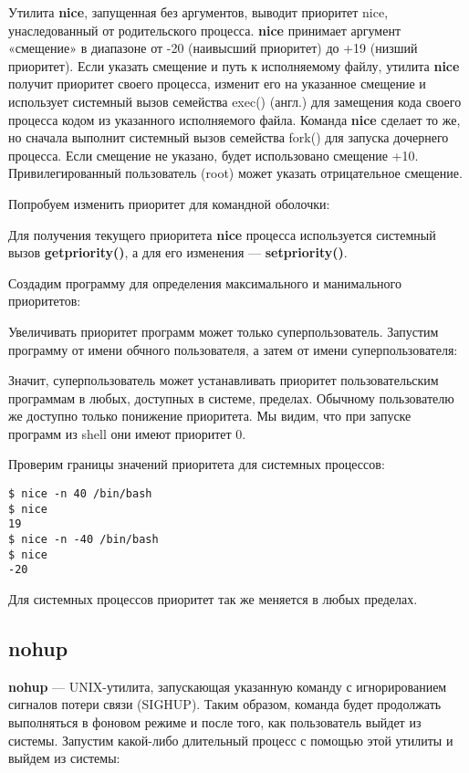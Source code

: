 \documentclass[a4paper]{article}
\begin{document}
	Утилита \textbf{nice}, запущенная без аргументов, выводит приоритет nice, унаследованный от родительского процесса. \textbf{nice} принимает аргумент «смещение» в диапазоне от -20 (наивысший приоритет) до +19 (низший приоритет). Если указать смещение и путь к исполняемому файлу, утилита \textbf{nice} получит приоритет своего процесса, изменит его на указанное смещение и использует системный вызов семейства exec() (англ.) для замещения кода своего процесса кодом из указанного исполняемого файла. Команда \textbf{nice} сделает то же, но сначала выполнит системный вызов семейства fork() для запуска дочернего процесса. Если смещение не указано, будет использовано смещение +10. Привилегированный пользователь (root) может указать отрицательное смещение.

	Попробуем изменить приоритет для командной оболочки:
	

	Для получения текущего приоритета \textbf{nice} процесса используется системный вызов \textbf{getpriority()}, а для его изменения — \textbf{setpriority()}.
	
	Создадим программу для определения максимального и манимального приоритетов:
		
	
	Увеличивать приоритет программ может только суперпользователь. Запустим программу от имени обчного пользователя, а затем от имени суперпользователя:
		
	
	Значит, суперпользователь может устанавливать приоритет пользовательским программам в любых, доступных в системе, пределах. Обычному пользователю же доступно только понижение приоритета. Мы видим, что при запуске программ из shell они имеют приоритет 0.

Проверим границы значений приоритета для системных процессов:
	\begin{lstlisting}[style=crs_bash]	
$ nice -n 40 /bin/bash
$ nice
19
$ nice -n -40 /bin/bash
$ nice
-20
	\end{lstlisting}
	
	Для системных процессов приоритет так же меняется в любых пределах.
	
	\subsection{nohup}
	\textbf{nohup} --- UNIX-утилита, запускающая указанную команду с игнорированием сигналов потери связи (SIGHUP). Таким образом, команда будет продолжать выполняться в фоновом режиме и после того, как пользователь выйдет из системы.
	Запустим какой-либо длительный процесс с помощью этой утилиты и выйдем из системы:
		
	
\end{document}
